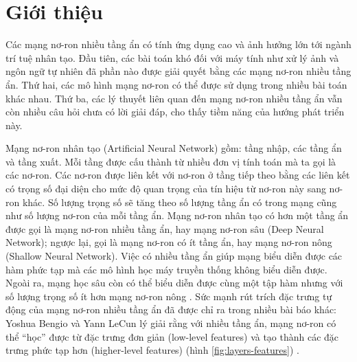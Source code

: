 \chapter{Giới thiệu}
\label{Chapter1}

Các mạng nơ-ron nhiều tầng ẩn có tính ứng dụng cao và ảnh hưởng lớn tới ngành trí tuệ nhân tạo. Đầu tiên, các bài toán khó đối với máy tính như xử lý ảnh và ngôn ngữ tự nhiên đã phần nào được giải quyết bằng các mạng nơ-ron nhiều tầng ẩn. Thứ hai, các mô hình mạng nơ-ron có thể được sử dụng trong nhiều bài toán khác nhau. Thứ ba, các lý thuyết liên quan đến mạng nơ-ron nhiều tầng ẩn vẫn còn nhiều câu hỏi chưa có lời giải đáp, cho thấy tiềm năng của hướng phát triển này.

Mạng nơ-ron nhân tạo (Artificial Neural Network) gồm: tầng nhập, các tầng ẩn và tầng xuất. Mỗi tầng được cấu thành từ nhiều đơn vị tính toán mà ta gọi là các nơ-ron. Các nơ-ron được liên kết với nơ-ron ở tầng tiếp theo bằng các liên kết có trọng số đại diện cho mức độ quan trọng của tín hiệu từ nơ-ron này sang nơ-ron khác. Số lượng trọng số sẽ tăng theo số lượng tầng ẩn có trong mạng cũng như số lượng nơ-ron của mỗi tầng ẩn. Mạng nơ-ron nhân tạo có hơn một tầng ẩn được gọi là mạng nơ-ron nhiều tầng ẩn, hay mạng nơ-ron sâu (Deep Neural Network); ngược lại, gọi là mạng nơ-ron có ít tầng ẩn, hay mạng nơ-ron nông (Shallow Neural Network). Việc có nhiều tầng ẩn giúp mạng biểu diễn được các hàm phức tạp mà các mô hình học máy truyền thống không biểu diễn được. Ngoài ra, mạng học sâu còn có thể biểu diễn được cùng một tập hàm nhưng với số lượng trọng số ít hơn mạng nơ-ron nông \cite{bengio2009learning}. Sức mạnh rút trích đặc trưng tự động của mạng nơ-ron nhiều tầng ẩn đã được chỉ ra trong nhiều bài báo khác: Yoshua Bengio và Yann LeCun lý giải rằng với nhiều tầng ẩn, mạng nơ-ron có thể ``học'' được từ đặc trưng đơn giản (low-level features) và tạo thành các đặc trưng phức tạp hơn (higher-level features) (hình \ref{fig:layers-features}) \cite{bengio2007scaling}.

